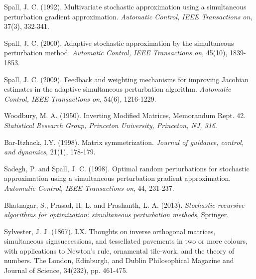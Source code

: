 \documentclass[conference]{IEEEtran}
\begin{document}
\begin{thebibliography}{1}

 Spall, J. C. (1992). Multivariate
  stochastic approximation using a simultaneous perturbation gradient
  approximation. \textit{Automatic Control, IEEE Transactions on},
  37(3), 332-341.

 Spall, J. C. (2000). Adaptive
  stochastic approximation by the simultaneous perturbation
  method. \textit{Automatic Control, IEEE Transactions on}, 45(10),
  1839-1853.

 Spall, J. C. (2009). Feedback and
  weighting mechanisms for improving Jacobian estimates in the adaptive
  simultaneous perturbation algorithm. \textit{Automatic Control, IEEE
    Transactions on}, 54(6), 1216-1229.

 Woodbury,
  M. A. (1950). Inverting Modified Matrices, Memorandum
  Rept. 42. \textit{Statistical Research Group, Princeton University,
    Princeton, NJ, 316}.

 Bar-Itzhack,
  I.Y. (1998). Matrix symmetrization. \textit{Journal of guidance,
    control, and dynamics}, 21(1), 178-179.


 Sadegh, P. and Spall,
  J. C. (1998). Optimal random perturbations for stochastic
  approximation using a simultaneous perturbation gradient
  approximation. \textit{Automatic Control, IEEE Transactions on}, 44,
  231-237.

 Bhatnagar, S., Prasad,
  H. L. and Prashanth, L. A. (2013). \textit{Stochastic recursive
    algorithms for optimization: simultaneous perturbation methods},
  Springer.

 Sylvester,
  J. J. (1867). LX. Thoughts on inverse orthogonal matrices,
  simultaneous signsuccessions, and tessellated pavements in two or more
  colours, with applications to Newton's rule, ornamental tile-work, and
  the theory of numbers. The London, Edinburgh, and Dublin Philosophical
  Magazine and Journal of Science, 34(232), pp. 461-475.

\end{thebibliography}
\end{document}
